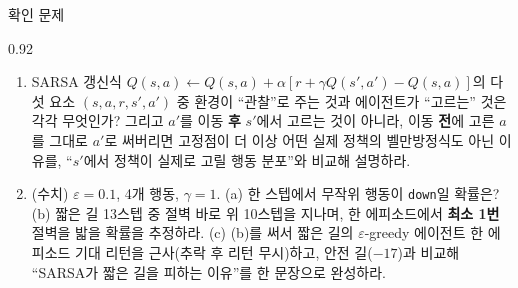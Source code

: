 \begin{frame}{확인 문제}
\begin{center}\begin{varwidth}{0.92\textwidth}
  \small
  \begin{enumerate}
    \item SARSA 갱신식 $Q(s,a) \leftarrow Q(s,a) + \alpha[r +
      \gamma Q(s',a') - Q(s,a)]$의 다섯 요소 $(s,a,r,s',a')$ 중
      환경이 ``관찰''로 주는 것과 에이전트가 ``고르는'' 것은 각각
      무엇인가? 그리고 $a'$를 이동 \textbf{후} $s'$에서 고르는 것이
      아니라, 이동 \textbf{전}에 고른 $a$를 그대로 $a'$로 써버리면
      고정점이 더 이상 어떤 실제 정책의 벨만방정식도 아닌 이유를,
      ``$s'$에서 정책이 실제로 고릴 행동 분포''와 비교해 설명하라.
    \item (수치) $\varepsilon=0.1$, 4개 행동, $\gamma=1$.
      (a) 한 스텝에서 무작위 행동이 \texttt{down}일 확률은?
      (b) 짧은 길 13스텝 중 절벽 바로 위 10스텝을 지나며, 한 에피소드에서
      \textbf{최소 1번} 절벽을 밟을 확률을 추정하라.
      (c) (b)를 써서 짧은 길의 $\varepsilon$-greedy 에이전트 한 에피소드
      기대 리턴을 근사(추락 후 리턴 무시)하고, 안전 길($-17$)과 비교해
      ``SARSA가 짧은 길을 피하는 이유''를 한 문장으로 완성하라.
  \end{enumerate}
\end{varwidth}\end{center}
\end{frame}
